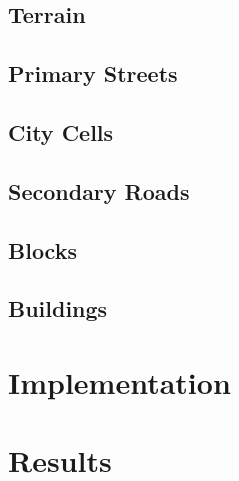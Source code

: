 \documentclass[a4paper,12pt]{scrartcl}
\begin{document}
\subsection{Terrain}

\subsection{Primary Streets}

\subsection{City Cells}

\subsection{Secondary Roads}

\subsection{Blocks}

\subsection{Buildings}

\section{Implementation}
\label{sec:implementation}

\section{Results}



\nocite{*}

\end{document}
